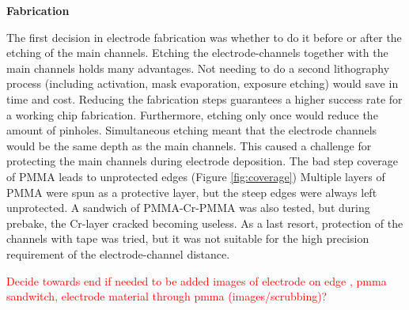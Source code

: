 \documentclass[final]{jyflluk}
\begin{document}
\begin{flushleft}\textbf{Fabrication} \end{flushleft}
The first decision in electrode fabrication was whether to do it before or after the etching of the main channels. Etching the electrode-channels together with the main channels holds many advantages. Not needing to do a second lithography process (including activation, mask evaporation, exposure etching) would save in time and cost. Reducing the fabrication steps guarantees a higher success rate for a working chip fabrication. Furthermore, etching only once would reduce the amount of pinholes. Simultaneous etching meant that the electrode channels would be the same depth as the main channels. This caused a challenge for protecting the main channels during electrode deposition. The bad step coverage of PMMA leads to unprotected edges (Figure \ref{fig:coverage}) Multiple layers of PMMA were spun as a protective layer, but the steep edges were always left unprotected. A sandwich of PMMA-Cr-PMMA was also tested, but during prebake, the Cr-layer cracked becoming useless. As a last resort, protection of the channels with tape was tried, but it was not suitable for the high precision requirement of the electrode-channel distance.

\textcolor{red}{Decide towards end if needed to be added}
\textcolor{red}{ images of electrode on edge , pmma sandwitch, electrode material through pmma (images/scrubbing)?}
\end{document}
